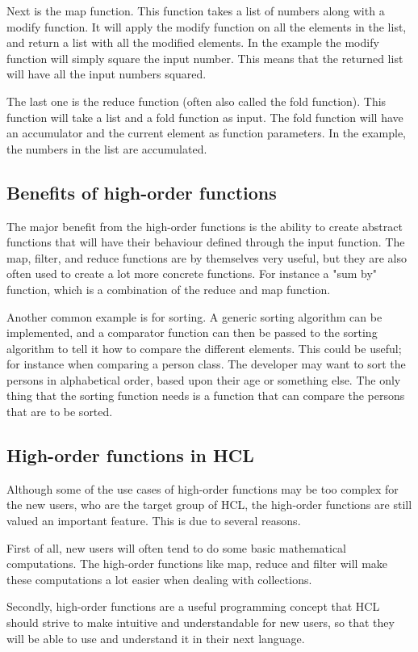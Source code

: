 Next is the map function. 
This function takes a list of numbers along with a modify function. 
It will apply the modify function on all the elements in the list, and return a list with all the modified elements.
In the example the modify function will simply square the input number. 
This means that the returned list will have all the input numbers squared.

The last one is the reduce function (often also called the fold function).
This function will take a list and a fold function as input. 
The fold function will have an accumulator and the current element as function parameters.
In the example, the numbers in the list are accumulated.

\subsection{Benefits of high-order functions}
The major benefit from the high-order functions is the ability to create abstract functions that will have their behaviour defined through the input function. 
The map, filter, and reduce functions are by themselves very useful, but they are also often used to create a lot more concrete functions. 
For instance a "sum by" function, which is a combination of the reduce and map function. 

Another common example is for sorting. 
A generic sorting algorithm can be implemented, and a comparator function can then be passed to the sorting algorithm to tell it how to compare the different elements.
This could be useful; for instance when comparing a person class. 
The developer may want to sort the persons in alphabetical order, based upon their age or something else. 
The only thing that the sorting function needs is a function that can compare the persons that are to be sorted.

\subsection{High-order functions in HCL}
Although some of the use cases of high-order functions may be too complex for the new users, who are the target group of HCL, the high-order functions are still valued an important feature.
This is due to several reasons.

First of all, new users will often tend to do some basic mathematical computations. 
The high-order functions like map, reduce and filter will make these computations a lot easier when dealing with collections. 

Secondly, high-order functions are a useful programming concept that HCL should strive to make intuitive and understandable for new users, so that they will be able to use and understand it in their next language.